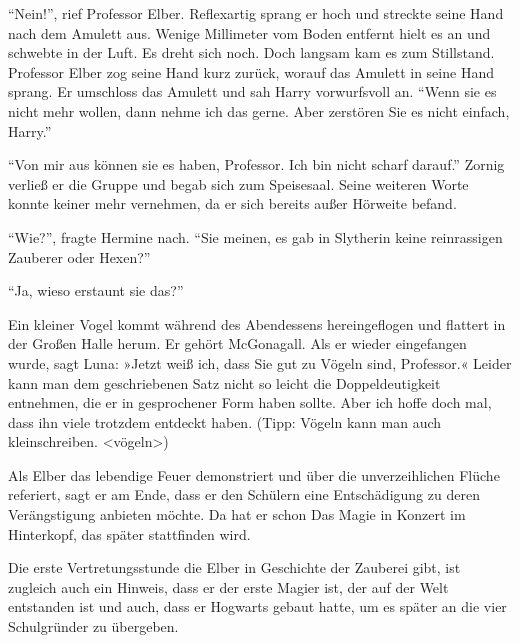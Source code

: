 \enquote{Nein!}, rief Professor Elber. Reflexartig sprang er hoch und streckte seine Hand nach dem Amulett aus. Wenige Millimeter vom Boden entfernt hielt es an und schwebte in der Luft. Es dreht sich noch. Doch langsam kam es zum Stillstand. Professor Elber zog seine Hand kurz zurück, worauf das Amulett in seine Hand sprang. Er umschloss das Amulett und sah Harry vorwurfsvoll an. \enquote{Wenn sie es nicht mehr wollen, dann nehme ich das gerne. Aber zerstören Sie es nicht einfach, Harry.}

\enquote{Von mir aus können sie es haben, Professor. Ich bin nicht scharf darauf.} Zornig verließ er die Gruppe und begab sich zum Speisesaal. Seine weiteren Worte konnte keiner mehr vernehmen, da er sich bereits außer Hörweite befand.

\enquote{Wie?}, fragte Hermine nach. \enquote{Sie meinen, es gab in Slytherin keine reinrassigen Zauberer oder Hexen?}

\enquote{Ja, wieso erstaunt sie das?}




\begin{kommentar}
Ein kleiner Vogel kommt während des Abendessens hereingeflogen und flattert in der Großen Halle herum. Er gehört McGonagall. Als er wieder eingefangen wurde, sagt Luna: »Jetzt weiß ich, dass Sie gut zu Vögeln sind, Professor.« Leider kann man dem geschriebenen Satz nicht so leicht die Doppeldeutigkeit entnehmen, die er in gesprochener Form haben sollte. Aber ich hoffe doch mal, dass ihn viele trotzdem entdeckt haben. (Tipp: Vögeln kann man auch kleinschreiben. <vögeln>)
\end{kommentar}

\begin{kommentar}
Als Elber das lebendige Feuer demonstriert und über die unverzeihlichen Flüche referiert, sagt er am Ende, dass er den Schülern eine Entschädigung zu deren Verängstigung anbieten möchte. Da hat er schon Das Magie in Konzert im Hinterkopf, das später stattfinden wird.
\end{kommentar}

\begin{kommentar}
Die erste Vertretungsstunde die Elber in Geschichte der Zauberei gibt, ist zugleich auch ein Hinweis, dass er der erste Magier ist, der auf der Welt entstanden ist und auch, dass er Hogwarts gebaut hatte, um es später an die vier Schulgründer zu übergeben.
\end{kommentar}
